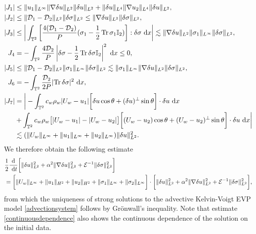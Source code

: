 \documentclass[12pt,a4paper]{article}
\theoremstyle{definition}
\theoremstyle{remark}
\numberwithin{equation}{section}
\newcommand{\dx}{\ {\rm d} {x}}
\newcommand{\dt}{\ {\rm d} t }
\DeclareMathOperator{\Tr}{Tr}
\begin{document}
\begin{align*}
\lvert J_1 \rvert &\leq \lVert u_1 \rVert_{L^\infty} \lVert \nabla \delta u \rVert_{L^2} \lVert \delta u \rVert_{L^2} + \lVert \delta u \rVert_{L^4} \lVert \nabla u_2 \rVert_{L^4} \lVert \delta u \rVert_{L^2}, \\
\lvert J_2 \rvert &\leq \lVert \mathcal{D}_1 - \mathcal{D}_2 \rVert_{L^2} \lVert \delta \sigma \rVert_{L^2} \leq \lVert \nabla \delta u \rVert_{L^2} \lVert \delta \sigma \rVert_{L^2}, \\
\lvert J_3 \rvert &\leq \bigg\lvert \int_{\mathbb{T}^2} \bigg[ \frac{4 (\mathcal{D}_1 - \mathcal{D}_2)}{P}(\sigma_1 - \frac{1}{2} \Tr \sigma_1 \mathbb I_2)  \bigg] : \delta \sigma \dx \bigg\rvert \lesssim \lVert \nabla \delta u \rVert_{L^2} \lVert \sigma_1 \rVert_{L^\infty} \lVert \delta \sigma \rVert_{L^2}, \\
J_4 &= - \int_{\mathbb{T}^2} \frac{4 \mathcal D_2}{P} \left\lvert \delta \sigma - \frac{1}{2} \Tr \delta \sigma \mathbb I_2 \right\rvert^2 \dx \leq 0, \\
\lvert J_5 \rvert &\leq \lVert \mathcal{D}_1 - \mathcal{D}_2 \rVert_{L^2} \lVert \sigma_1 \rVert_{L^\infty} \lVert \delta \sigma \rVert_{L^2} \lesssim \lVert \sigma_1 \rVert_{L^\infty} \lVert \nabla \delta u \rVert_{L^2} \lVert \delta \sigma \rVert_{L^2}, \\
J_6 &= - \int_{\mathbb T^2} \frac{\mathcal D_2}{2P} \lvert \Tr \delta \sigma \rvert^2 \dx, \\
\lvert J_7 \rvert &= \bigg\lvert - \int_{\mathbb{T}^2} c_w \rho_w \lvert U_w - u_1 \rvert \bigg[ \delta u \cos \theta + (\delta u)^\perp \sin \theta \bigg] \cdot \delta u \dx \\
&+ \int_{\mathbb{T}^2} c_w \rho_w \big[ \lvert U_w - u_1 \rvert - \lvert U_w - u_2 \rvert \big] \bigg[ (U_w - u_2) \cos \theta + (U_w - u_2)^\perp \sin \theta \bigg] \cdot \delta u \dx \bigg\rvert \\
&\lesssim (\lVert U_w \rVert_{L^\infty} + \lVert u_1 \rVert_{L^\infty} + \lVert u_2 \rVert_{L^\infty} ) \lVert \delta u \rVert_{L^2}^2.
\end{align*}
We therefore obtain the following estimate
\begin{align}
&\frac{1}{2} \frac{\rm d}{\dt} \bigg[ \lVert \delta u \rVert_{L^2}^2 + \alpha^2 \lVert \nabla \delta u \rVert_{L^2}^2 + \mathcal{E}^{-1} \lVert \delta \sigma \rVert_{L^2}^2 \bigg] \label{continuousdependence} \\
&= \bigg[ \lVert U_w \rVert_{L^\infty} + \lVert u_1 \rVert_{H^2} + \lVert u_2 \rVert_{H^2} + \lVert \sigma_1 \rVert_{L^\infty} + \lVert \sigma_2 \rVert_{L^\infty} \bigg] \cdot \bigg[ \lVert \delta u \rVert_{L^2}^2 + \alpha^2 \lVert \nabla \delta u \rVert_{L^2}^2 + \mathcal{E}^{-1} \lVert \delta \sigma \rVert_{L^2}^2 \bigg], \nonumber
\end{align}
from which the uniqueness of strong solutions to the advective Kelvin-Voigt EVP model \eqref{advectionsystem} follows by Grönwall's inequality. Note that estimate \eqref{continuousdependence} also shows the continuous dependence of the solution on the initial data. 
\end{document}
